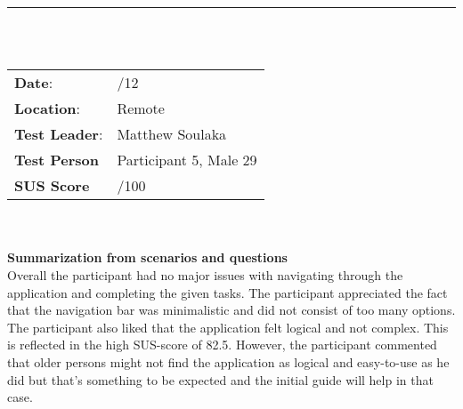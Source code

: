 \noindent\rule{15.1cm}{0.4pt}\\
\\
\begin{tabularx}{0.6\textwidth}{ >{\raggedright\arraybackslash}X  >{\raggedright\arraybackslash}X  }
\textbf{Date}: & 1/12  \\
\textbf{Location}: & Remote  \\
\textbf{Test Leader}: & Matthew Soulaka  \\
\textbf{Test Person} & Participant 5, Male 29  \\
\textbf{SUS Score} & 82.5/100  \\

\end{tabularx}\\
\\
\textbf{Summarization from scenarios and questions} \\
\noindent Overall the participant had no major issues with navigating through the application and completing the given tasks. The participant appreciated the fact that the navigation bar was minimalistic and did not consist of too many options. The participant also liked that the application felt logical and not complex. This is reflected in the high SUS-score of 82.5. However, the participant commented that older persons might not find the application as logical and easy-to-use as he did but that’s something to be expected and the initial guide will help in that case.  \\

